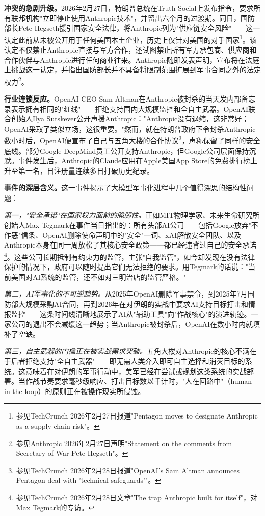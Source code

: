 {\bfseries 冲突的急剧升级。}2026年2月27日，特朗普总统在Truth Social上发布指令，要求所有联邦机构"立即停止使用Anthropic技术"，并留出六个月的过渡期。同日，国防部长Pete Hegseth援引国家安全法律，将Anthropic列为"供应链安全风险"——这一认定此前从未被公开用于任何美国本土企业，历史上仅针对美国的对手国家\footnote{参见TechCrunch 2026年2月27日报道"Pentagon moves to designate Anthropic as a supply-chain risk"。}。该认定不仅禁止Anthropic直接与军方合作，还试图禁止所有军方承包商、供应商和合作伙伴与Anthropic进行任何商业往来。Anthropic随即发表声明，宣布将在法庭上挑战这一认定，并指出国防部长并不具备将限制范围扩展到军事合同之外的法定权力\footnote{参见Anthropic 2026年2月27日声明"Statement on the comments from Secretary of War Pete Hegseth"。}。

{\bfseries 行业连锁反应。}OpenAI CEO Sam Altman在Anthropic被封杀的当天发内部备忘录表示拥有相同的"红线"——拒绝支持国内大规模监控和全自主武器。OpenAI联合创始人Ilya Sutskever公开声援Anthropic："Anthropic没有退缩，这非常好；OpenAI采取了类似立场，这很重要。"然而，就在特朗普政府下令封杀Anthropic数小时后，OpenAI便宣布了自己与五角大楼的合作协议\footnote{参见TechCrunch 2026年2月28日报道"OpenAI's Sam Altman announces Pentagon deal with 'technical safeguards'"。}，声称保留了同样的安全底线。部分Google DeepMind员工公开支持Anthropic，但Google公司层面保持沉默。事件发生后，Anthropic的Claude应用在Apple美国App Store的免费排行榜上升至第一名，日注册量连续多日打破历史纪录。

{\bfseries 事件的深层含义。}这一事件揭示了大模型军事化进程中几个值得深思的结构性问题：

\emph{第一，"安全承诺"在国家权力面前的脆弱性。}正如MIT物理学家、未来生命研究所创始人Max Tegmark在事件当日指出的：所有头部AI公司——包括Google放弃"不作恶"信条、OpenAI删除使命声明中的"安全"一词、xAI解散安全团队、以及Anthropic本身在同一周放松了其核心安全政策——都已经违背过自己的安全承诺\footnote{参见TechCrunch 2026年2月28日文章"The trap Anthropic built for itself"，对Max Tegmark的专访。}。这些公司长期抵制有约束力的监管，主张"自我监管"，如今却发现在没有法律保护的情况下，政府可以随时提出它们无法拒绝的要求。用Tegmark的话说："当前美国对AI系统的监管，还不如对三明治店的监管严格。"

\emph{第二，AI军事化的不可逆趋势。}从2025年OpenAI删除军事禁令，到2025年7月国防部大规模采购AI合同，再到2026年在对伊朗的实战中要求AI支持目标打击和情报监控——这条时间线清晰地展示了AI从"辅助工具"向"作战核心"的演进轨迹。一家公司的退出不会减缓这一趋势；当Anthropic被封杀后，OpenAI在数小时内就填补了空缺。

\emph{第三，自主武器的门槛正在被实战需求突破。}五角大楼对Anthropic的核心不满在于后者拒绝支持"全自主武器"——即无需人类介入即可自主选择和消灭目标的系统。这意味着在对伊朗的军事行动中，美军已经在尝试或规划这类系统的实战部署。当作战节奏要求毫秒级响应、打击目标数以千计时，"人在回路中"（human-in-the-loop）的原则正在被操作现实所侵蚀。

